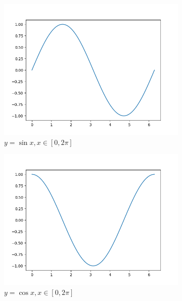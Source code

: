 \documentclass{article}
\begin{document}
\thispagestyle{empty}
\begin{figure}
    \centering
    \begin{subfigure}{0.3\linewidth}
        \includegraphics[width=\linewidth]{../figures/sin.png}
        \caption{\(y=\sin x, x\in[0,2\pi]\)}
    \end{subfigure}
    \begin{subfigure}{0.3\linewidth}
        \includegraphics[width=\linewidth]{../figures/cos.png}
        \caption{\(y=\cos x, x\in[0,2\pi]\)}
    \end{subfigure}
    \\
    \begin{subfigure}{0.3\linewidth}

\end{subfigure}
\end{figure}
\end{document}
